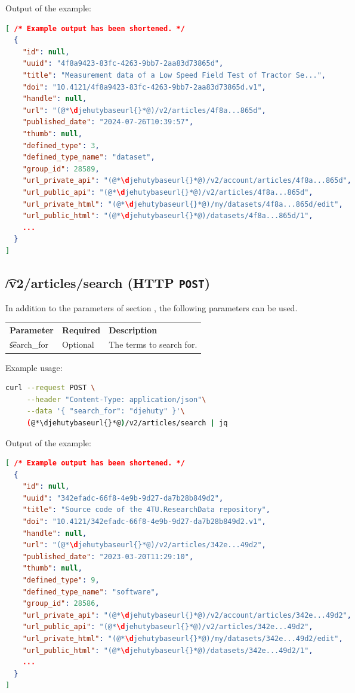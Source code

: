   Output of the example:
\begin{lstlisting}[language=JSON]
[ /* Example output has been shortened. */
  {
    "id": null,
    "uuid": "4f8a9423-83fc-4263-9bb7-2aa83d73865d",
    "title": "Measurement data of a Low Speed Field Test of Tractor Se...",
    "doi": "10.4121/4f8a9423-83fc-4263-9bb7-2aa83d73865d.v1",
    "handle": null,
    "url": "(@*\djehutybaseurl{}*@)/v2/articles/4f8a...865d",
    "published_date": "2024-07-26T10:39:57",
    "thumb": null,
    "defined_type": 3,
    "defined_type_name": "dataset",
    "group_id": 28589,
    "url_private_api": "(@*\djehutybaseurl{}*@)/v2/account/articles/4f8a...865d",
    "url_public_api": "(@*\djehutybaseurl{}*@)/v2/articles/4f8a...865d",
    "url_private_html": "(@*\djehutybaseurl{}*@)/my/datasets/4f8a...865d/edit",
    "url_public_html": "(@*\djehutybaseurl{}*@)/datasets/4f8a...865d/1",
    ...
  }
]
\end{lstlisting}

\subsection{\t{/v2/articles/search} (HTTP \texttt{POST})}

  In addition to the parameters of section , the
  following parameters can be used.

\begin{tabularx}{\textwidth}{*{2}{!{\VRule[-1pt]}l}!{\VRule[-1pt]}X}
  \headrow
  \textbf{Parameter}   & \textbf{Required} & \textbf{Description}\\
  \t{search\_for}      & Optional & The terms to search for.\\
\end{tabularx}

  Example usage:
\begin{lstlisting}[language=bash]
curl --request POST \
     --header "Content-Type: application/json"\
     --data '{ "search_for": "djehuty" }'\
     (@*\djehutybaseurl{}*@)/v2/articles/search | jq
\end{lstlisting}

  Output of the example:
\begin{lstlisting}[language=JSON]
[ /* Example output has been shortened. */
  {
    "id": null,
    "uuid": "342efadc-66f8-4e9b-9d27-da7b28b849d2",
    "title": "Source code of the 4TU.ResearchData repository",
    "doi": "10.4121/342efadc-66f8-4e9b-9d27-da7b28b849d2.v1",
    "handle": null,
    "url": "(@*\djehutybaseurl{}*@)/v2/articles/342e...49d2",
    "published_date": "2023-03-20T11:29:10",
    "thumb": null,
    "defined_type": 9,
    "defined_type_name": "software",
    "group_id": 28586,
    "url_private_api": "(@*\djehutybaseurl{}*@)/v2/account/articles/342e...49d2",
    "url_public_api": "(@*\djehutybaseurl{}*@)/v2/articles/342e...49d2",
    "url_private_html": "(@*\djehutybaseurl{}*@)/my/datasets/342e...49d2/edit",
    "url_public_html": "(@*\djehutybaseurl{}*@)/datasets/342e...49d2/1",
    ...
  }
]
\end{lstlisting}

